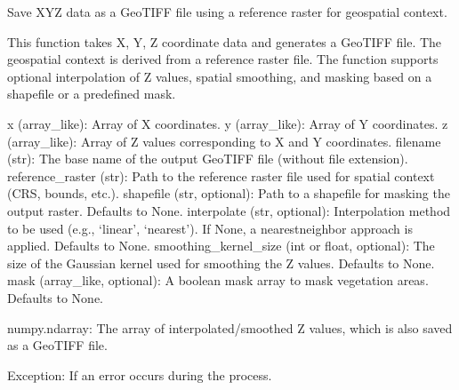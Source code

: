 \documentclass[letterpaper,10pt,english]{sphinxmanual}
\begin{document}
\begin{fulllineitems}
\label{\detokenize{akhdefo_functions:akhdefo_functions.Akhdefo_GOI.interpolate_xyz}}
\pysigstartsignatures
{}
\pysigstopsignatures
\sphinxAtStartPar
Save XYZ data as a GeoTIFF file using a reference raster for geospatial context.

\sphinxAtStartPar
This function takes X, Y, Z coordinate data and generates a GeoTIFF file. The geospatial context
is derived from a reference raster file. The function supports optional interpolation of Z values,
spatial smoothing, and masking based on a shapefile or a predefined  mask.
\begin{description}
\sphinxAtStartPar
x (array\_like): Array of X coordinates.
y (array\_like): Array of Y coordinates.
z (array\_like): Array of Z values corresponding to X and Y coordinates.
filename (str): The base name of the output GeoTIFF file (without file extension).
reference\_raster (str): Path to the reference raster file used for spatial context (CRS, bounds, etc.).
shapefile (str, optional): Path to a shapefile for masking the output raster. Defaults to None.
interpolate (str, optional): Interpolation method to be used (e.g., ‘linear’, ‘nearest’). If None, a nearest\sphinxhyphen{}neighbor approach is applied. Defaults to None.
smoothing\_kernel\_size (int or float, optional): The size of the Gaussian kernel used for smoothing the Z values. Defaults to None.
mask (array\_like, optional): A boolean mask array to mask vegetation areas. Defaults to None.

\sphinxAtStartPar
numpy.ndarray: The array of interpolated/smoothed Z values, which is also saved as a GeoTIFF file.

\sphinxAtStartPar
Exception: If an error occurs during the process.


\end{description}
\end{fulllineitems}
\end{document}
